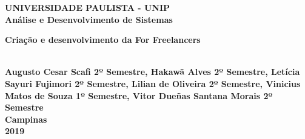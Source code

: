 \thispagestyle{empty}
\begin{center}
	\normalsize{\textbf{UNIVERSIDADE PAULISTA - UNIP}}\\[0.3pc]
	\normalsize{\textbf{Análise e Desenvolvimento de Sistemas}}\\[7pc]
	
	\parbox{10cm}{\begin{center}\normalsize{\textbf{Criação e desenvolvimento da For Freelancers}}\end{center}}\\

	\vspace{160pt}
	\normalsize{\textbf{Augusto Cesar Scafi 2º Semestre, Hakawã Alves 2º Semestre, Letícia Sayuri Fujimori 2º Semestre, Lilian de Oliveira 2º Semestre, Vinicius Matos de Souza 1º Semestre, Vitor Dueñas Santana Morais 2º Semestre}}\\[1pc]
	\vfill
	\normalsize{\textbf{Campinas}}\\[1pc]
	\normalsize{\textbf{2019}}
\end{center}
\newpage 